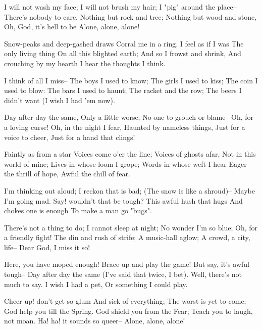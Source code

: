 
\begin{poemblock}
 I will not wash my face;
  I will not brush my hair;
 I "pig" around the place--
  There's nobody to care.
 Nothing but rock and tree;
  Nothing but wood and stone,
 Oh, God, it's hell to be
  Alone, alone, alone!

 Snow-peaks and deep-gashed draws
  Corral me in a ring.
 I feel as if I was
  The only living thing
 On all this blighted earth;
  And so I frowst and shrink,
 And crouching by my hearth
  I hear the thoughts I think.

 I think of all I miss--
  The boys I used to know;
 The girls I used to kiss;
  The coin I used to blow:
 The bars I used to haunt;
  The racket and the row;
 The beers I didn't want
  (I wish I had 'em now).

 Day after day the same,
  Only a little worse;
 No one to grouch or blame--
  Oh, for a loving curse!
 Oh, in the night I fear,
  Haunted by nameless things,
 Just for a voice to cheer,
  Just for a hand that clings!

 Faintly as from a star
  Voices come o'er the line;
 Voices of ghosts afar,
  Not in this world of mine;
 Lives in whose loom I grope;
  Words in whose weft I hear
 Eager the thrill of hope,
  Awful the chill of fear.

 I'm thinking out aloud;
  I reckon that is bad;
 (The snow is like a shroud)--
  Maybe I'm going mad.
 Say! wouldn't that be tough?
  This awful hush that hugs
 And chokes one is enough
  To make a man go "bugs".

 There's not a thing to do;
  I cannot sleep at night;
 No wonder I'm so blue;
  Oh, for a friendly fight!
 The din and rush of strife;
  A music-hall aglow;
 A crowd, a city, life--
  Dear God, I miss it so!

 Here, you have moped enough!
  Brace up and play the game!
 But say, it's awful tough--
  Day after day the same
 (I've said that twice, I bet).
  Well, there's not much to say.
 I wish I had a pet,
  Or something I could play.

 Cheer up! don't get so glum
  And sick of everything;
 The worst is yet to come;
  God help you till the Spring.
 God shield you from the Fear;
  Teach you to laugh, not moan.
 Ha! ha! it sounds so queer--
  Alone, alone, alone!

\end{poemblock}
